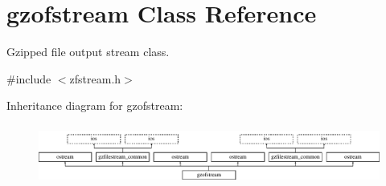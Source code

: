 \hypertarget{classgzofstream}{}\section{gzofstream Class Reference}
\label{classgzofstream}


Gzipped file output stream class.  




{\ttfamily \#include $<$zfstream.\+h$>$}

Inheritance diagram for gzofstream\+:\begin{figure}[H]
\begin{center}
\leavevmode
\includegraphics[height=2.000000cm]{classgzofstream}
\end{center}
\end{figure}
